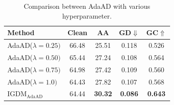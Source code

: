 \documentclass{article} %
\begin{document}


\begin{table}
 \centering
 \vspace{-0.4cm}
 \caption{Comparison between AdaAD with various hyperparameter.}
    \setlength{\tabcolsep}{3pt}
 \begin{tabular}{lcccc}
  \toprule

Method & Clean &  AA & GD$\Downarrow$ & GC$\Uparrow$ \\
\midrule
AdaAD($\lambda=0.25)$& 66.48 & 25.51 & 0.118  &  0.526 \\
AdaAD($\lambda=0.50)$& 65.44 & 27.24 & 0.108  &  0.564 \\
AdaAD($\lambda=0.75)$& 64.98 & 27.42 & 0.109  &  0.560 \\
AdaAD($\lambda=1.0)$& 64.43 & 27.82 & 0.107  & 0.568 \\
\midrule
 IGDM$_{\text{AdaAD}}$& 64.44 & \textbf{30.32} & \textbf{0.086}  & \textbf{0.643} \\
 \bottomrule
 \end{tabular}
 \label{tab:hyper_adaad}
\end{table}
\end{document}
